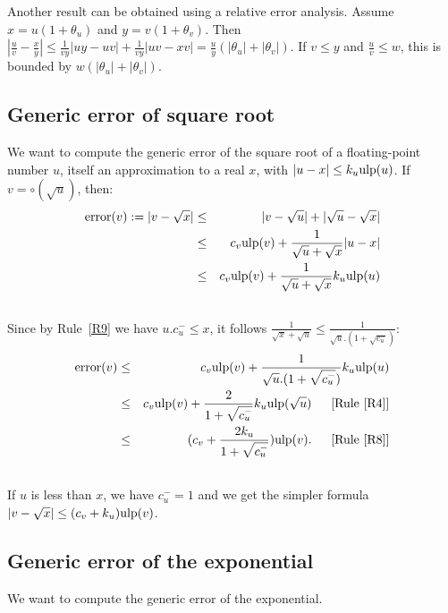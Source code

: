 \documentclass[12pt]{amsart}
\def\ulp{{\rm ulp}}
\newcommand{\U}[1]{\quad \mbox{[Rule~\ref{#1}]}}
\DeclareMathOperator{\error}{error}
\begin{document}
Another result can be obtained using a relative error analysis.
Assume $x = u (1 + \theta_u)$ and $y = v (1 + \theta_v)$. Then
$|\frac{u}{v} - \frac{x}{y}| \leq \frac{1}{vy} |uy - uv|
+ \frac{1}{vy} |uv - xv|
= \frac{u}{y} (|\theta_u|+|\theta_v|)$.
If $v \leq y$ and $\frac{u}{v} \leq w$,
this is bounded by $w (|\theta_u|+|\theta_v|)$.

\subsection{Generic error of square root}\label{generic:sqrt}


We want to compute the generic error of the square root of a floating-point
number $u$, itself an approximation to a real $x$,
with $|u - x| \leq k_u \ulp(u)$.
If $v = \circ(\sqrt{u})$, then:
\begin{eqnarray}\nonumber
\error(v) := |v - \sqrt{x}|
& \leq &|v - \sqrt{u}| +|\sqrt{u} - \sqrt{x}| \\\nonumber
& \leq & c_v \ulp(v) + \frac{1}{\sqrt{u} + \sqrt{x}}|u-x| \\\nonumber
& \leq & c_v \ulp(v) + \frac{1}{\sqrt{u} + \sqrt{x}} k_u \ulp(u) \\\nonumber
\end{eqnarray}
Since by Rule~\ref{R9} we have $u.c_u^- \leq x$,
it follows $\frac{1}{\sqrt{x}+\sqrt{u}} \leq
        \frac{1}{\sqrt{u}.(1+\sqrt{c_u^-})}$:
\begin{eqnarray}\nonumber
\error(v)& \leq & c_v \ulp(v) +
                 \frac{1}{\sqrt{u}.(1+\sqrt{c_u^-})}  k_u \ulp(u) \\\nonumber
& \leq & c_v \ulp(v) + \frac{2}{1+\sqrt{c_u^-}}
       k_u \ulp(\sqrt{u}) \;\; \U{R4}\\\nonumber
& \leq & (c_v + \frac{2k_u}{1+\sqrt{c_u^-}})  \ulp(v). \;\; \U{R8}\\\nonumber
\end{eqnarray}
If $u$ is less than $x$, we have $c_u^-=1$ and
we get the simpler formula
$|v-\sqrt{x}| \leq (c_v + k_u)  \ulp(v)$.

\subsection{Generic error of the exponential }\label{generic:exp}


We want to compute the generic error of the exponential.
\end{document}
